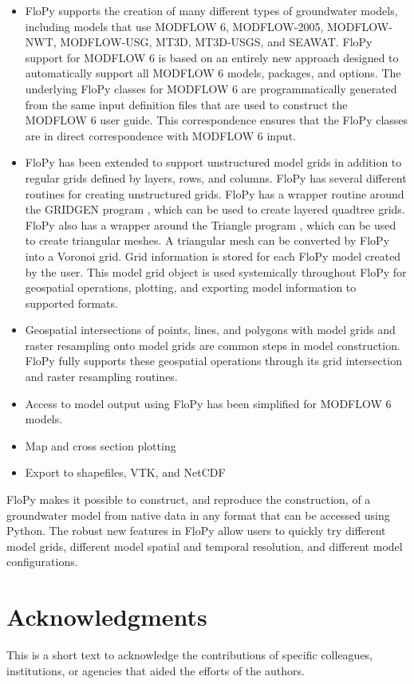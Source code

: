\documentclass[11pt, oneside]{article}   	%
\begin{document}
\begin{itemize}
\item FloPy supports the creation of many different types of groundwater models, including models that use MODFLOW 6, MODFLOW-2005, MODFLOW-NWT, MODFLOW-USG, MT3D, MT3D-USGS, and SEAWAT.  FloPy support for MODFLOW 6 is based on an entirely new approach designed to automatically support all MODFLOW 6 models, packages, and options.  The underlying FloPy classes for MODFLOW 6 are programmatically generated from the same input definition files that are used to construct the MODFLOW 6 user guide.  This correspondence ensures that the FloPy classes are in direct correspondence with MODFLOW 6 input.
\item FloPy has been extended to support unstructured model grids in addition to regular grids defined by layers, rows, and columns.  FloPy has several different routines for creating unstructured grids.  FloPy has a wrapper routine around the GRIDGEN program \citep{gridgen}, which can be used to create layered quadtree grids.  FloPy also has a wrapper around the Triangle program \citep{trianglemesh}, which can be used to create triangular meshes.  A triangular mesh can be converted by FloPy into a Voronoi grid.  Grid information is stored for each FloPy model created by the user.  This model grid object is used systemically throughout FloPy for geospatial operations, plotting, and exporting model information to supported formats.
\item Geospatial intersections of points, lines, and polygons with model grids and raster resampling onto model grids are common steps in model construction.  FloPy fully supports these geospatial operations through its grid intersection and raster resampling routines.
\item Access to model output using FloPy has been simplified for MODFLOW 6 models.  
\item Map and cross section plotting
\item Export to shapefiles, VTK, and NetCDF
\end{itemize}

FloPy makes it possible to construct, and reproduce the construction, of a groundwater model from native data in any format that can be accessed using Python.  The robust new features in FloPy allow users to quickly try different model grids, different model spatial and temporal resolution, and different model configurations.  

\section*{Acknowledgments}
This is a short text to acknowledge the contributions of specific colleagues, institutions, or agencies that aided the efforts of the authors.
\end{document}
